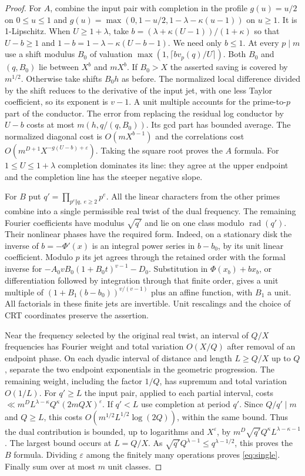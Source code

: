 \documentclass[11pt,letterpaper]{article}
\theoremstyle{definition}
\newcommand{\eps}{\varepsilon}
\DeclareMathOperator{\rad}{rad}
\begin{document}
\begin{proof}
For $A$, combine the input pair with completion in the profile
$g(u)=u/2$ on $0\le u\le1$ and
$g(u)=\max(0,1-u/2,1-\lambda-\kappa(u-1))$ on $u\ge1$.
It is 1-Lipschitz. When $U\ge1+\lambda$, take
$b=(\lambda+\kappa(U-1))/(1+\kappa)$ so that $U-b\ge1$ and
$1-b=1-\lambda-\kappa(U-b-1)$. We need only $b\le1$.
At every $p\mid m$ use a shift modulus $B_0$ of valuation
$\max(1,\lceil b v_p(q)/U\rceil)$. Both $B_0$ and $(q,B_0)$
lie between $X^b$ and $m X^b$. If $B_0>X$ the asserted saving is
covered by $m^{1/2}$. Otherwise take shifts $B_0h$ as before. The
normalized local difference divided by the shift reduces to the
derivative of the input jet, with one less Taylor coefficient, so its
exponent is $v-1$. A unit multiple accounts for the prime-to-$p$ part
of the conductor. The error from replacing the residual log conductor by
$U-b$ costs at most $m(h,q/(q,B_0))$. Its gcd part has bounded average.
The normalized diagonal cost is $O(mX^{b-1})$ and the correlations cost
$O(m^{D+1}X^{-g(U-b)+\eps})$. Taking the square root proves the $A$
formula. For $1\le U\le1+\lambda$ completion dominates its line:
they agree at the upper endpoint and the completion line has the
steeper negative slope.

For $B$ put $q'=\prod_{p^e\Vert q,\ e\ge2}p^e$.
All the linear characters from the other primes combine into a single
permissible real twist of the dual frequency. The remaining Fourier
coefficients have modulus $\sqrt{q'}$ and lie on one class modulo
$\rad(q')$. Their nonlinear phases have the required form. Indeed,
on a stationary disk the inverse of $b=-\Phi'(x)$ is an integral power
series in $b-b_0$, by its unit linear coefficient. Modulo $p$ its jet
agrees through the retained order with the formal inverse for
$-A_0vB_0(1+B_0t)^{v-1}-D_0$. Substitution in $\Phi(x_b)+b x_b$,
or differentiation followed by integration through that finite order,
gives a unit multiple of
$(1+B_1(b-b_0))^{v/(v-1)}$ plus an affine function, with $B_1$ a unit.
All factorials in these finite jets are invertible. Unit rescalings
and the choice of CRT coordinates preserve the assertion.

Near the frequency selected by the original real twist, an interval
of $Q/X$ frequencies has Fourier weight and total variation
$O(X/Q)$ after removal of an endpoint phase. On each dyadic interval
of distance and length $L\ge Q/X$ up to $Q$, separate the two endpoint
exponentials in the geometric progression. The remaining weight,
including the factor $1/Q$, has supremum and total variation $O(1/L)$.
For $q'\ge L$ the input pair, applied to each partial interval, costs
$\ll m^D L^{\lambda-\kappa}Q^\kappa(2mQX)^\eps$. If $q'<L$ use
completion at period $q'$. Since $Q/q'\mid m$ and $Q\ge L$, this
costs $O(m^{1/2}L^{1/2}\log(2Q))$, within the same bound.
Thus the dual contribution is bounded, up to logarithms and $X^\eps$,
by $m^D\sqrt{q'} Q^\kappa L^{\lambda-\kappa-1}$.
The largest bound occurs at $L=Q/X$. As
$\sqrt{q'}Q^{\lambda-1}\le q^{\lambda-1/2}$, this proves the
$B$ formula. Dividing $\eps$ among the finitely many operations proves
\eqref{eq:single}. Finally sum over at most $m$ unit classes.
\end{proof}
\end{document}
